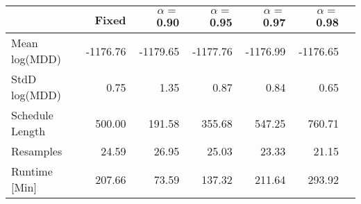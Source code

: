 \begin{tabular} {lrrrrrr} 
 \hline \hline 
&Fixed&$\alpha = $0.90&$\alpha = $0.95&$\alpha = $0.97&$\alpha = $0.98\\ 
 \hline 
Mean log(MDD)&-1176.76&-1179.65&-1177.76&-1176.99&-1176.65\\ 
StdD log(MDD)&0.75&1.35&0.87&0.84&0.65\\ 
Schedule Length&500.00&191.58&355.68&547.25&760.71\\ 
Resamples&24.59&26.95&25.03&23.33&21.15\\ 
Runtime [Min]&207.66&73.59&137.32&211.64&293.92\\ 
\hline 
\end{tabular}